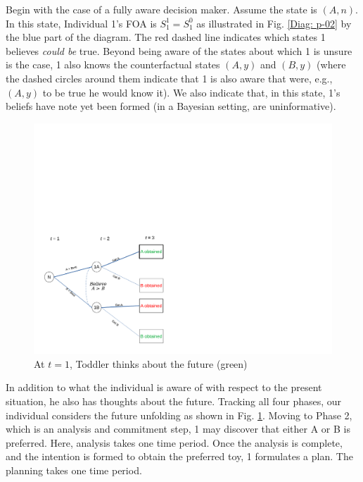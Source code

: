 \documentclass[
11pt,
titlepage,
reqno,
]{article}%
\theoremstyle{definition}
\begin{document}
Begin with the case of a fully aware decision maker. Assume the state is $(A,n)$. In this state, Individual 1's FOA is $S_1^1=S^0_1$ as illustrated in Fig. \ref{Diag: p-02} by the blue part of the diagram. The red dashed line indicates which states 1 believes \textit{could be} true. Beyond being aware of the states about which 1 is unsure is the case, 1 also knows the counterfactual states $(A,y)$ and $(B,y)$ (where the dashed circles around them indicate that 1 is also aware that were, e.g., $(A,y)$ to be true he would know it). We also indicate that, in this state, 1's beliefs have note yet been formed (in a Bayesian setting, are uninformative).

\begin{figure}[h!]
	\centering
	\includegraphics*[page=7,trim = 0 0in 0in 0in,scale=.65]{Awareness_Diagrams_All}
	\caption{At $t=1$, Toddler thinks about the future (green)\label{Diag: p-04}}%
\end{figure}

In addition to what the individual is aware of with respect to the present situation, he also has thoughts about the future. Tracking all four phases, our individual considers the future unfolding as shown in Fig. \ref{Diag: p-04}. Moving to Phase 2, which is an analysis and commitment step, 1 may discover that either A or B is preferred. Here, analysis takes one time period. Once the analysis is complete, and the intention is formed to obtain the preferred toy, 1 formulates a plan. The planning takes one time period.
\end{document}
